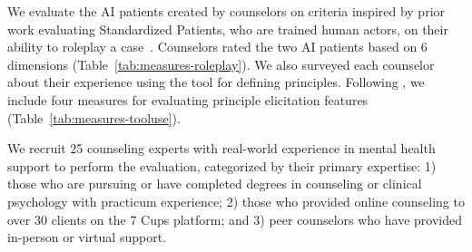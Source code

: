 \documentclass[11pt]{article}
\begin{document}
We evaluate the AI patients created by counselors on criteria inspired by prior work evaluating Standardized Patients, who are trained human actors, on their ability to roleplay a case~\cite{himmelbauer2018standardized}. Counselors rated the two AI patients based on 6 dimensions (Table~\ref{tab:measures-roleplay}).
We also surveyed each counselor about their experience using the tool for defining principles. 
Following , we include four measures for evaluating principle elicitation features (Table~\ref{tab:measures-tooluse}).

We recruit 25 counseling experts with real-world experience in mental health support to perform the evaluation, categorized by their primary expertise: 1) those who are pursuing or have completed degrees in counseling or clinical psychology with practicum experience; 2) those who provided online counseling to over 30 clients on the 7 Cups platform; and 3) peer counselors who have provided in-person or virtual support. 

\end{document}
